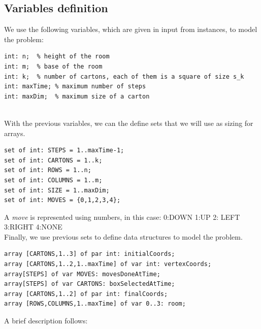 \documentclass[headinclude, footinclude, abstract=on]{scrarticle}
\begin{document}
\subsection{Variables definition}
We use the following variables, which are given in input from instances, to model the problem:
\begin{verbatim}
int: n;  % height of the room
int: m;  % base of the room
int: k;  % number of cartons, each of them is a square of size s_k
int: maxTime; % maximum number of steps
int: maxDim;  % maximum size of a carton
\end{verbatim}
\\
With the previous variables, we can the define sets that we will use as sizing for arrays.
\begin{verbatim}
set of int: STEPS = 1..maxTime-1;
set of int: CARTONS = 1..k;
set of int: ROWS = 1..n;
set of int: COLUMNS = 1..m;
set of int: SIZE = 1..maxDim;
set of int: MOVES = {0,1,2,3,4};  
\end{verbatim}
A \textit{move} is represented using numbers, in this case: 0:DOWN  1:UP  2: LEFT  3:RIGHT  4:NONE
\\
Finally, we use previous sets to define data structures to model the problem.
\label{sec:def}
\begin{verbatim}
array [CARTONS,1..3] of par int: initialCoords;   
array [CARTONS,1..2,1..maxTime] of var int: vertexCoords;  
array[STEPS] of var MOVES: movesDoneAtTime; 
array[STEPS] of var CARTONS: boxSelectedAtTime; 
array [CARTONS,1..2] of par int: finalCoords;   
array [ROWS,COLUMNS,1..maxTime] of var 0..3: room;  
\end{verbatim}
A brief description follows:
\end{document}
